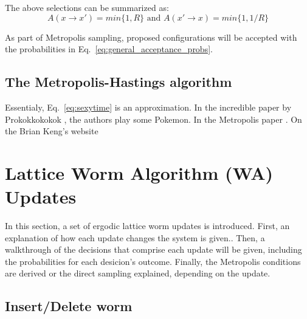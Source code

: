 \documentclass[12pt, two sided]{article}
\begin{document}
The above selections can be summarized as:
%
\begin{equation}
\label{eq:general_acceptance_probs}
A(x \to x') = min\{1,R\} \text{ and } A(x' \to x) = min\{1,1/R\}
\end{equation}
%

As part of Metropolis sampling, proposed configurations will be accepted with the probabilities in Eq.~\eqref{eq:general_acceptance_probs}.

\subsection{The Metropolis-Hastings algorithm}

Essentialy, Eq.~\eqref{eq:sexytime} is an approximation. In the incredible paper by Prokokkokokok \cite{Prokof_ev_1998}, the authors play some Pokemon. In the Metropolis paper \cite{doi:10.1063/1.1699114}. On the Brian Keng's website \cite{bkeng.metropolis}

\section{Lattice Worm Algorithm (WA) Updates}

In this section, a set of ergodic lattice worm updates is introduced. First, an explanation of how each update changes the system is given.. Then, a walkthrough of the decisions that comprise each update will be given, including the probabilities for each desicion's outcome. Finally, the Metropolis conditions are derived or the direct sampling explained, depending on the update.

	\subsection{Insert/Delete worm}
        
\end{document}
